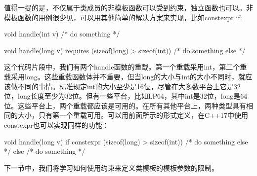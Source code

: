 值得一提的是，不仅属于类成员的非模板函数可以受到约束，独立函数也可以。非模板函数的用例很少见，可以用其他简单的解决方案来实现，比如constexpr if:

\begin{cppcode}
void handle(int v)
{ /* do something */ }

void handle(long v)
	requires (sizeof(long) > sizeof(int))
{ /* do something else */ }
\end{cppcode}

这个代码片段中，我们有两个handle函数的重载。第一个重载采用int，第二个重载采用long。这些重载函数体并不重要，但当long的大小与int的大小不同时，就应该做不同的事情。标准规定int的大小至少是16位，尽管在大多数平台上它是32位，long长度至少为32位。但有一些平台，比如LP64，其中int是32位，long是64位。这些平台上，两个重载都应该是可用的。在所有其他平台上，两种类型具有相同的大小，只有第一个重载可用。可以用前面所示的形式定义，在C++17中使用constexpr也可以实现同样的功能：

\begin{cppcode}
void handle(long v)
{
	if constexpr (sizeof(long) > sizeof(int))
	{
		/* do something else */
	}
	else
	{
		/* do something */
	}
}
\end{cppcode}

下一节中，我们将学习如何使用约束来定义类模板的模板参数的限制。


